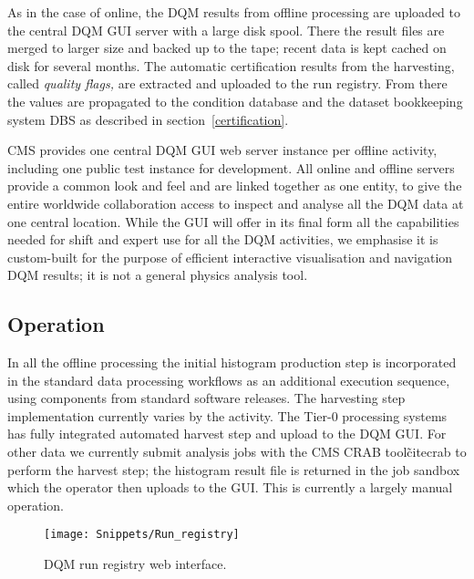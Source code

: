 \documentclass[a4paper]{jpconf}
\begin{document}
As in the case of online, the DQM results from offline processing are uploaded
to the central DQM GUI server with a large disk spool.  There the result files
are merged to larger size and backed up to the tape; recent data is kept
cached on disk for several months.  The automatic certification results from
the harvesting, called {\em quality flags,} are extracted and uploaded to the
run registry.  From there the values are propagated to the condition database
and the dataset bookkeeping system DBS as described in
section~\ref{certification}.

CMS provides one central DQM GUI web server instance per offline activity,
including one public test instance for development.  All online and offline
servers provide a common look and feel and are linked together as one entity,
to give the entire worldwide collaboration access to inspect and analyse all
the DQM data at one central location.  While the GUI will offer in its final
form all the capabilities needed for shift and expert use for all the DQM
activities, we emphasise it is custom-built for the purpose of efficient
interactive visualisation and navigation DQM results; it is not a general
physics analysis tool.

\subsection{Operation}

In all the offline processing the initial histogram production step is
incorporated in the standard data processing workflows as an additional
execution sequence, using components from standard software releases.  The
harvesting step implementation currently varies by the activity.  The Tier-0
processing systems has fully integrated automated harvest step and upload to
the DQM GUI.  For other data we currently submit analysis jobs with the CMS
CRAB tool\~cite{crab} to perform the harvest step; the histogram result file
is returned in the job sandbox which the operator then uploads to the GUI.
This is currently a largely manual operation.


\begin{figure}[!tbp]
\begin{center}
\texttt{[image: Snippets/Run\_registry]}
\caption{\label{fig:runregistry}DQM run registry web interface.}
\end{center}
\end{figure}
\end{document}
